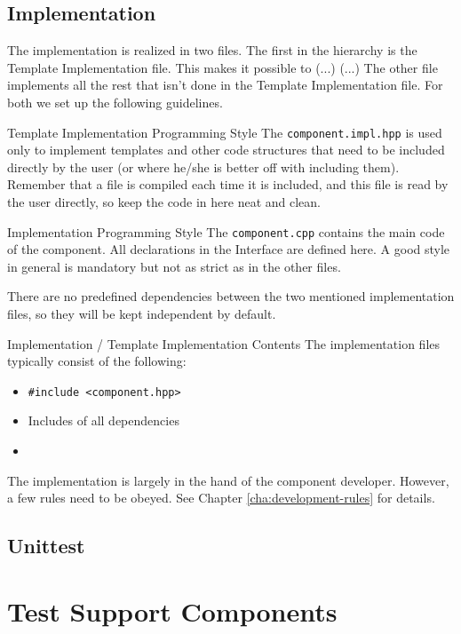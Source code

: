 \subsection{Implementation}
\label{sec:implementation}

The implementation is realized in two files. The first in the hierarchy
is the Template Implementation file. This makes it possible to (...)
(...) The other file implements all the rest that isn't done in the Template
Implementation file. For both we set up the following guidelines.

\begin{guideline*}{Template Implementation Programming Style}
  The {\tt component.impl.hpp} is used only to implement templates and other
  code structures that need to be included directly by the user (or where
  he/she is better off with including them). Remember that a file is compiled
  each time it is included, and this file is read by the user directly, so
  keep the code in here neat and clean.
\end{guideline*}

\begin{guideline*}{Implementation Programming Style}
  The {\tt component.cpp} contains the main code of the component. All
  declarations in the Interface are defined here. A good style in general
  is mandatory but not as strict as in the other files.
\end{guideline*}
%
There are no predefined dependencies between the two mentioned implementation
files, so they will be kept independent by default.
%
\begin{guideline*}{Implementation / Template Implementation Contents}
  The implementation files typically consist of the following:
  \begin{itemize}
    \item{{\tt \#include <component.hpp>}}
    \item{Includes of all dependencies}
    \item{}
  \end{itemize}
\end{guideline*}
%
The implementation is largely in the hand of the component developer. However,
a few rules need to be obeyed. See Chapter \ref{cha:development-rules} for
details.

\subsection{Unittest}
\label{sec:unittest}

\section{Test Support Components}
\label{sec:test-supp-comp}






